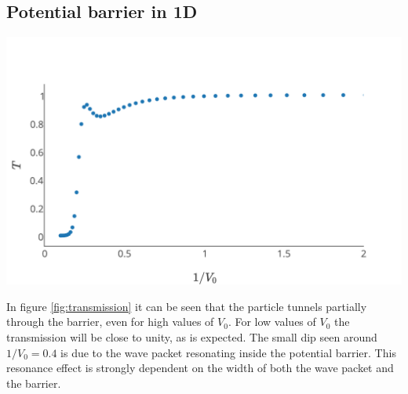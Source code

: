 \subsection*{Potential barrier in 1D}
\begin{Figure}
    \centering
    \includegraphics[width=\linewidth]{transmission_1d_pot_barrier2.pdf}
    \label{fig:transmission}
\end{Figure} In figure \ref{fig:transmission} it can be seen that the particle tunnels partially through the barrier, even for high values of $V_0$. For low values of $V_0$ the transmission will be close to unity, as is expected. The small dip seen around $1/V_0=0.4$ is due to the wave packet resonating inside the potential barrier. This resonance effect is strongly dependent on the width of both the wave packet and the barrier.

